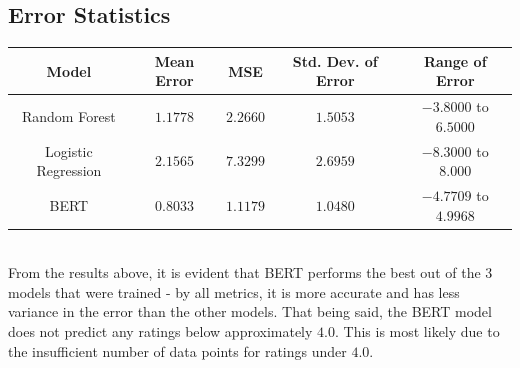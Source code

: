 \documentclass[11pt]{article}
\begin{document}
\subsection{Error Statistics}
\begin{tabular}{c|cccc}
Model & Mean Error & MSE & Std. Dev. of Error & Range of Error\\
\hline
Random Forest & $1.1778$ & $2.2660$ & $1.5053$ & $-3.8000$ to $6.5000$\\
Logistic Regression & $2.1565$ & $7.3299$ & $2.6959$ & $-8.3000$ to $8.000$\\
BERT & $0.8033$ & $1.1179$ & $1.0480$ & $-4.7709$ to $4.9968$
\end{tabular}\\[5mm]
From the results above, it is evident that BERT performs the best out of the 3 models that were trained - by all metrics, it is more accurate and has less variance in the error than the other models.  That being said, the BERT model does not predict any ratings below approximately $4.0$.  This is most likely due to the insufficient number of data points for ratings under $4.0$.
\end{document}
